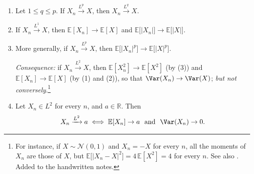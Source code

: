 \begin{proposition}[Convergence in $L^p$]\label{prop:ll-Lp}
\leavevmode
\begin{enumerate}[label=(\arabic*)]
  \item Let $1\le q\le p$. If $X_n\xrightarrow{L^p}X$, then $X_n\xrightarrow{L^q}X$.
  \item If $X_n\xrightarrow{L^1}X$, then $\mathbb E[X_n]\to\mathbb E[X]$ and
    $\mathbb E\big[|X_n|\big]\to\mathbb E\big[|X|\big]$.
  \item More generally, if $X_n\xrightarrow{L^p}X$, then
    $\mathbb E\big[|X_n|^p\big]\to\mathbb E\big[|X|^p\big]$.

    \emph{Consequence:} if $X_n\xrightarrow{L^2}X$, then $\mathbb E[X_n^2]\to\mathbb E[X^2]$ (by
    (3)) and $\mathbb E[X_n]\to\mathbb E[X]$ (by (1) and (2)), so that $\Var(X_n)\to\Var(X)$;
    \emph{but not conversely}.\footnote{For instance, if $X\sim\mathcal N(0,1)$ and $X_n=-X$ for
    every $n$, all the moments of $X_n$ are those of $X$, but
    $\mathbb E\big[|X_n-X|^2\big]=4\,\mathbb E[X^2]=4$ for every $n$. See also
    . Added to the handwritten notes.}
  \item Let $X_n\in L^2$ for every $n$, and $a\in\mathbb R$. Then
    \[
      X_n\xrightarrow{L^2}a\iff\mathbb E[X_n]\to a\ \text{ and }\ \Var(X_n)\to0 .
    \]
\end{enumerate}
\end{proposition}

